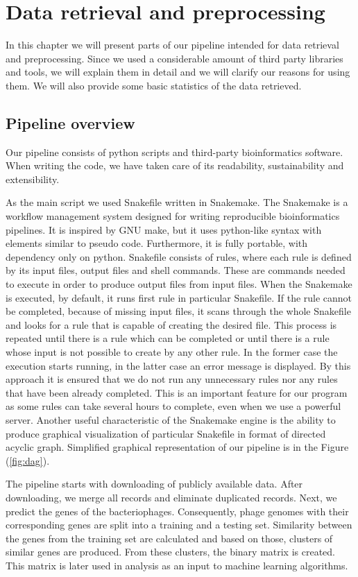 \chapter{Data retrieval and preprocessing}
In this chapter we will present parts of our pipeline intended for data retrieval and preprocessing.
Since we used a considerable amount of third party libraries and tools, we will explain them in detail and we will clarify our reasons for using them.
We will also provide some basic statistics of the data retrieved.

\section{Pipeline overview}
Our pipeline consists of python scripts and third-party bioinformatics software.
When writing the code, we have taken care of its readability, sustainability and extensibility.

As the main script we used Snakefile written in Snakemake.
The Snakemake is a workflow management system designed for writing reproducible bioinformatics pipelines.
It is inspired by GNU make, but it uses python-like syntax with elements similar to pseudo code.
Furthermore, it is fully portable, with dependency only on python.
Snakefile consists of rules, where each rule is defined by its input files, output files and shell commands.
These are commands needed to execute in order to produce output files from input files.
When the Snakemake is executed, by default, it runs first rule in particular Snakefile.
If the rule cannot be completed, because of missing input files, it scans through the whole Snakefile and looks for a rule that is capable of creating the desired file.
This process is repeated until there is a rule which can be completed or until there is a rule whose input is not possible to create by any other rule.
In the former case the execution starts running, in the latter case an error message is displayed.
By this approach it is ensured that we do not run any unnecessary rules nor any rules that have been already completed.
This is an important feature for our program as some rules can take several hours to complete, even when we use a powerful server.
Another useful characteristic of the Snakemake engine is the ability to produce graphical visualization of particular Snakefile in format of directed acyclic graph.
Simplified graphical representation of our pipeline is in the Figure (\ref{fig:dag}).

The pipeline starts with downloading of publicly available data.
After downloading, we merge all records and eliminate duplicated records.
Next, we predict the genes of the bacteriophages.
Consequently, phage genomes with their corresponding genes are split into a training and a testing set.
Similarity between the genes from the training set are calculated and based on those, clusters of similar genes are produced.
From these clusters, the binary matrix is created.
This matrix is later used in analysis as an input to machine learning algorithms.

